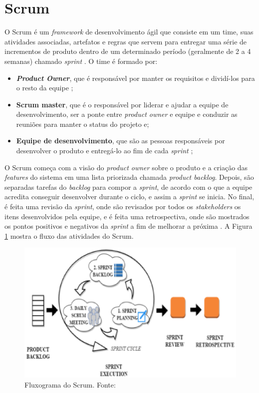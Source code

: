 \section{Scrum}

O Scrum é um \textit{framework} de desenvolvimento ágil que consiste em um time, suas atividades associadas, artefatos e regras que servem para entregar uma série de incrementos de produto dentro de um determinado período (geralmente de 2 a 4 semanas) chamado \textit{sprint} \cite{livro-scrum}.
O time é formado por:
\begin{itemize}
\item \textbf{\textit{Product Owner}}, que é responsável por manter os requisitos e dividí-los para o resto da equipe \cite{product-owner};
\item \textbf{Scrum master}, que é o responsável por liderar e ajudar a equipe de desenvolvimento, ser a ponte entre \textit{product owner} e equipe e conduzir as reuniões para manter o status do projeto \cite{scrum-master} e;
\item \textbf{Equipe de desenvolvimento}, que são as pessoas responsáveis por desenvolver o produto e entregá-lo ao fim de cada \textit{sprint} \cite{equipe-dev};
\end{itemize}
O Scrum começa com a visão do \textit{product owner} sobre o produto e a criação das \textit{features} do sistema em uma lista priorizada chamada \textit{product backlog}. Depois, são separadas tarefas do \textit{backlog} para compor a \textit{sprint}, de acordo com o que a equipe acredita conseguir desenvolver durante o ciclo, e assim a \textit{sprint} se inicia. No final, é feita uma revisão da \textit{sprint}, onde são revisados por todos os \textit{stakeholders} os itens desenvolvidos pela equipe, e é feita uma retrospectiva, onde são mostrados os pontos positivos e negativos da \textit{sprint} a fim de melhorar a próxima \cite{livro-scrum}. A Figura \ref{img:scrum} mostra o fluxo das atividades do Scrum.

\begin{figure}[h!]
    \centering
    \includegraphics[keepaspectratio=true,scale=0.5]{figuras/scrum.eps}
    \caption[Fluxograma do Scrum]{Fluxograma do Scrum. Fonte: \cite{artigo-scrum}}
    \label{img:scrum}
\end{figure}

